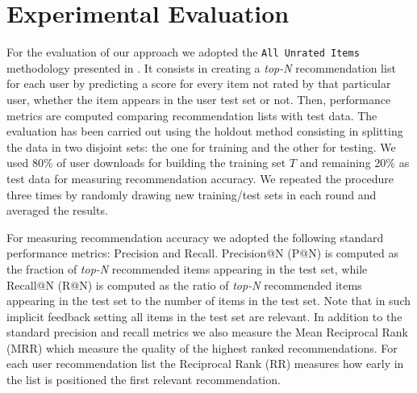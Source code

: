 \section{Experimental Evaluation}
\label{sec:graph-rec:evaluation}
For the evaluation of our approach we adopted the \texttt{All Unrated Items} methodology presented in \cite{Steck13}. It consists in creating a \textit{top-N}\xspace recommendation list for each user by predicting a score for every item not rated by that particular user, whether the item appears in the user test set or not. Then, performance metrics are computed comparing recommendation lists with test data.  
The evaluation has been carried out using the holdout method consisting in splitting the data in two disjoint sets: the one for training and the other for testing. We used 80\% of user downloads for building the training set $T$ and remaining 20\% as test data for measuring recommendation accuracy. We repeated the procedure three times by randomly drawing new training/test sets in each round and averaged the results.

For measuring recommendation accuracy we adopted the following standard performance metrics: Precision and Recall. 
Precision@N (P@N) is computed as the fraction of \textit{top-N}\xspace recommended items appearing in the test set, while Recall@N (R@N) is computed as the ratio of \textit{top-N}\xspace recommended items appearing in the test set to the number of items in the test set. Note that in such implicit feedback setting all items in the test set are relevant. In addition to the standard precision and recall metrics we also measure the Mean Reciprocal Rank (MRR) which measure the quality of the highest ranked recommendations. For each user recommendation list the Reciprocal Rank (RR) measures how early in the list is positioned the first relevant recommendation. 

